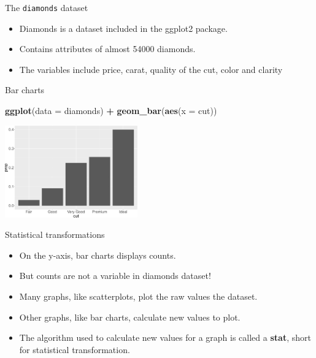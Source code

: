 \documentclass[ignorenonframetext,]{beamer}
\newenvironment{Shaded}{\begin{snugshade}}{\end{snugshade}}
\newcommand{\DataTypeTok}[1]{\textcolor[rgb]{0.13,0.29,0.53}{#1}}
\newcommand{\KeywordTok}[1]{\textcolor[rgb]{0.13,0.29,0.53}{\textbf{#1}}}
\newcommand{\NormalTok}[1]{#1}
\newcommand{\OperatorTok}[1]{\textcolor[rgb]{0.81,0.36,0.00}{\textbf{#1}}}
\newcommand{\StringTok}[1]{\textcolor[rgb]{0.31,0.60,0.02}{#1}}
\begin{document}
\begin{frame}{The \texttt{diamonds} dataset}
\protect\hypertarget{the-diamonds-dataset}{}

\begin{itemize}
\item
  Diamonds is a dataset included in the ggplot2 package.
\item
  Contains attributes of almost 54000 diamonds.
\item
  The variables include price, carat, quality of the cut, color and
  clarity
\end{itemize}

\end{frame}

\begin{frame}[fragile]{Bar charts}
\protect\hypertarget{bar-charts}{}

\begin{Shaded}
\begin{Highlighting}[]
\KeywordTok{ggplot}\NormalTok{(}\DataTypeTok{data =}\NormalTok{ diamonds) }\OperatorTok{+}\StringTok{ }
\StringTok{  }\KeywordTok{geom_bar}\NormalTok{(}\KeywordTok{aes}\NormalTok{(}\DataTypeTok{x =}\NormalTok{ cut))}
\end{Highlighting}
\end{Shaded}

\begin{center}\includegraphics[height=150px]{data-visualization_files/figure-beamer/unnamed-chunk-121-1} \end{center}

\end{frame}

\begin{frame}{Statistical transformations}
\protect\hypertarget{statistical-transformations}{}

\begin{itemize}
\item
  On the y-axis, bar charts displays counts.
\item
  But counts are not a variable in diamonds dataset!
\item
  Many graphs, like scatterplots, plot the raw values the dataset.
\item
  Other graphs, like bar charts, calculate new values to plot.
\item
  The algorithm used to calculate new values for a graph is called a
  \textbf{stat}, short for statistical transformation.
\end{itemize}

\end{frame}
\end{document}
